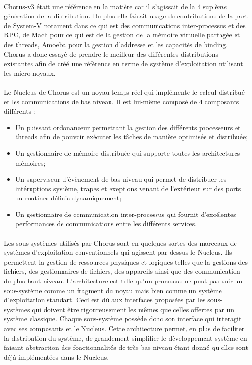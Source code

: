 \documentclass[a4paper, 12pt]{article}
\begin{document}
\paragraph{}
Chorus-v3 était une référence en la matière car il s'agissait de la 4$\sup{ème}$ génération de la distribution. De plus elle faisait usage de contributions de la part de System-V notament dans ce qui est des communications inter-processus et des RPC, de Mach pour ce qui est de la gestion de la mémoire virtuelle partagée et des threads, Amoeba pour la gestion d'addresse et les capacités de binding. Chorus a donc essayé de prendre le meilleur des différentes distributions existantes afin de créé une référence en terme de système d'exploitation utilisant les micro-noyaux.
\\
\paragraph{}
Le Nucleus de Chorus est un noyau temps réel qui implémente le calcul distribué et les communications de bas niveau. Il est lui-même composé de 4 composants différents :
\begin{itemize}
	\item Un puissant ordonanceur permettant la gestion des différents processeurs et threads afin de pouvoir exécuter les tâches de manière optimisée et distribuée;
	\item Un gestionnaire de mémoire distribuée qui supporte toutes les architectures mémoires;
	\item Un superviseur d'évènement de bas niveau qui permet de distribuer les intéruptions système, trapes et exeptions venant de l'extérieur sur des ports ou routines définis dynamiquement;
	\item Un gestionnaire de communication inter-processus qui fournit d'excélentes performances de communications entre les différents services.
\end{itemize}

\paragraph{}
Les sous-systèmes utilisés par Chorus sont en quelques sortes des morceaux de systèmes d'exploitation conventionnels qui agissent par dessus le Nucleus. Ils permettent la gestion de ressources physiques et logiques telles que la gestions des fichiers, des gestionnaires de fichiers, des appareils ainsi que des communication de plus haut niveau. L'architecture est telle qu'un processus ne peut pas voir un sous-système comme un fragment du noyau mais bien comme un système d'exploitation standart. Ceci est dû aux interfaces proposées par les sous-systèmes qui doivent être rigoureusement les mêmes que celles offertes par un système classique. Chaque sous-système possède donc son interface qui interagit avec ses composants et le Nucleus. Cette architecture permet, en plus de faciliter la distribution du système, de grandement simplifier le développement système en faisant abstraction des fonctionnalités de très bas niveau étant donné qu'elles sont déjà implémentées dans le Nucleus.
\end{document}
